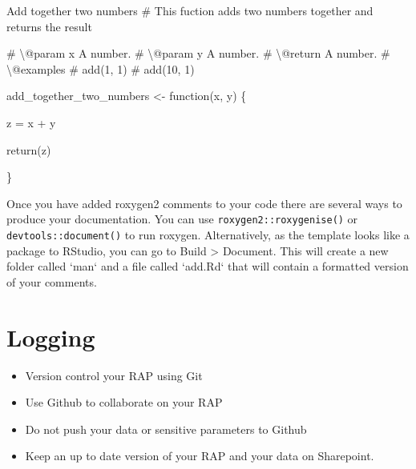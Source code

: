 \documentclass[
  letterpaper,
]{book}
\newenvironment{Shaded}{\begin{snugshade}}{\end{snugshade}}
\newcommand{\CommentTok}[1]{\textcolor[rgb]{0.37,0.37,0.37}{#1}}
\newcommand{\ControlFlowTok}[1]{\textcolor[rgb]{0.00,0.23,0.31}{#1}}
\newcommand{\FunctionTok}[1]{\textcolor[rgb]{0.28,0.35,0.67}{#1}}
\newcommand{\NormalTok}[1]{\textcolor[rgb]{0.00,0.23,0.31}{#1}}
\newcommand{\OtherTok}[1]{\textcolor[rgb]{0.00,0.23,0.31}{#1}}
\newcommand{\SpecialCharTok}[1]{\textcolor[rgb]{0.37,0.37,0.37}{#1}}
\newcommand{\StringTok}[1]{\textcolor[rgb]{0.13,0.47,0.30}{#1}}
\begin{document}
\begin{Shaded}
\begin{Highlighting}[]
\StringTok{\textquotesingle{} Add together two numbers}
\StringTok{\# This fuction adds two numbers together and returns the result}

\StringTok{\#\textquotesingle{}}\NormalTok{ \textbackslash{}}\SpecialCharTok{@}\NormalTok{param x A number.}
\CommentTok{\#\textquotesingle{} \textbackslash{}@param y A number.}
\CommentTok{\#\textquotesingle{} \textbackslash{}@return A number.}
\CommentTok{\#\textquotesingle{} \textbackslash{}@examples}
\CommentTok{\#\textquotesingle{} add(1, 1)}
\CommentTok{\#\textquotesingle{} add(10, 1)}

\NormalTok{add\_together\_two\_numbers }\OtherTok{\textless{}{-}} \ControlFlowTok{function}\NormalTok{(x, y) \{}

\NormalTok{z }\OtherTok{=}\NormalTok{ x }\SpecialCharTok{+}\NormalTok{ y}

\FunctionTok{return}\NormalTok{(z)}

\NormalTok{\}}
\end{Highlighting}
\end{Shaded}

Once you have added roxygen2 comments to your code there are several
ways to produce your documentation. You can use
\texttt{roxygen2::roxygenise()} or \texttt{devtools::document()} to run
roxygen. Alternatively, as the template looks like a package to RStudio,
you can go to Build \textgreater{} Document. This will create a new
folder called `man` and a file called `add.Rd` that will contain a
formatted version of your comments.


\hypertarget{sec-logging}{%
\chapter{Logging}\label{sec-logging}}

\begin{tcolorbox}[enhanced jigsaw, toprule=.15mm, left=2mm, colback=white, breakable, title=\textcolor{quarto-callout-note-color}{\faInfo}\hspace{0.5em}{Key Points}, colframe=quarto-callout-note-color-frame, opacitybacktitle=0.6, coltitle=black, titlerule=0mm, bottomrule=.15mm, rightrule=.15mm, bottomtitle=1mm, toptitle=1mm, arc=.35mm, leftrule=.75mm, opacityback=0, colbacktitle=quarto-callout-note-color!10!white]

\begin{itemize}
\item
  Version control your RAP using Git
\item
  Use Github to collaborate on your RAP
\item
  Do not push your data or sensitive parameters to Github
\item
  Keep an up to date version of your RAP and your data on Sharepoint.
\end{itemize}

\end{tcolorbox}
\end{document}
